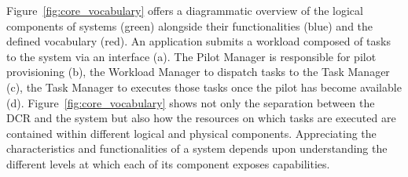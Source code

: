 \documentclass{sig-alternate}
\begin{document}


Figure~\ref{fig:core_vocabulary} offers a diagrammatic overview of the logical
components of \pilot systems (green) alongside their functionalities (blue) and
the defined vocabulary (red). An application submits a workload composed of
tasks to the \pilot system via an interface (a). The Pilot Manager is
responsible for pilot provisioning (b), the Workload Manager to dispatch tasks
to the Task Manager (c), the Task Manager to executes those tasks once the pilot
has become available (d). Figure~\ref{fig:core_vocabulary} shows not only the
separation between the DCR and the \pilot system but also how the resources on
which tasks are executed are contained within different logical and physical
components. Appreciating the characteristics and functionalities of a
\pilot system depends upon understanding the different levels at which each of
its component exposes capabilities.

\end{document}
